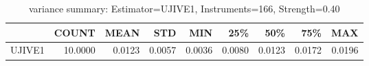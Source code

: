 \begin{table}[ht]
\centering
\caption{variance summary: Estimator=UJIVE1, Instruments=166, Strength=0.40}
\begin{tabular}{lrrrrrrrr}
\toprule
 & COUNT & MEAN & STD & MIN & 25\% & 50\% & 75\% & MAX \\
\midrule
UJIVE1 & 10.0000 & 0.0123 & 0.0057 & 0.0036 & 0.0080 & 0.0123 & 0.0172 & 0.0196 \\
\bottomrule
\end{tabular}
\end{table}
